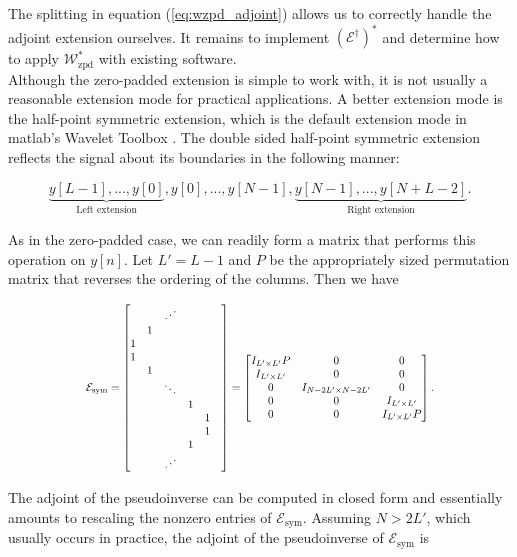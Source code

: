 \documentclass[journal]{IEEEtran}
\newcommand\scalemath[2]{\scalebox{#1}{\mbox{\ensuremath{\displaystyle #2}}}}
\begin{document}
\noindent The splitting in equation (\ref{eq:wzpd_adjoint}) allows us to correctly handle the adjoint extension ourselves.  It remains to implement $\left(\mathcal{E}^\dagger\right)^\ast$ and determine how to apply $\mathcal{W}^\ast_\text{zpd}$ with existing software.\\

Although the zero-padded extension is simple to work with, it is not usually a reasonable extension mode for practical applications.  A better extension mode is the half-point symmetric extension, which is the default extension mode in {\sc matlab}'s Wavelet Toolbox \cite{matlab_wt_2015}.  The double sided half-point symmetric extension reflects the signal about its boundaries in the following manner:

\[ \underbrace{y[L-1], ..., y[0]}_\text{Left extension}, y[0], ..., y[N-1], \underbrace{y[N-1], ..., y[N+L-2]}_\text{Right extension}. \] 

\noindent As in the zero-padded case, we can readily form a matrix that performs this operation on $y[n]$.  Let $L'=L-1$ and $P$ be the appropriately sized permutation matrix that reverses the ordering of the columns.  Then we have

\[ \scalemath{0.8}{\mathcal{E}_\text{sym} = \begin{bmatrix} & & \iddots & & &\\ & 1 &&&&\\ 1&&&&&\\1&&&&\\&1&&&&\\&&\ddots&&&\\&&&1&\\&&&&1\\&&&&1\\&&&1&\\&&\iddots&&\end{bmatrix} = \begin{bmatrix}I_{L'\times L'}P & 0 & 0\\I_{L'\times L'} & 0 & 0\\0 & I_{N-2L'\times N-2L'} & 0\\0&0&I_{L'\times L'}\\0&0&I_{L'\times L'}P\end{bmatrix}.} \]

\noindent The adjoint of the pseudoinverse can be computed in closed form and essentially amounts to rescaling the nonzero entries of $\mathcal{E}_\text{sym}$.  Assuming $N > 2L'$, which usually occurs in practice, the adjoint of the  pseudoinverse of $\mathcal{E}_\text{sym}$ is 
\end{document}
